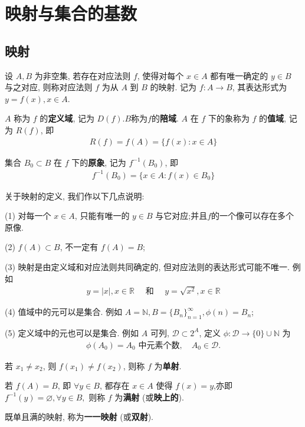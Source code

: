 \documentclass[../../main.tex]{subfiles}
\begin{document}
\section{映射与集合的基数}

\subsection{映射}

\begin{definition}[映射]
设 $A, B$ 为非空集, 若存在对应法则 $f$, 使得对每个 $x \in A$ 都有唯一确定的 $y \in B$ 与之对应, 则称对应法则 $f$ 为从 $A$ 到 $B$ 的映射. 记为 $f : A \to B$, 其表达形式为 $y = f(x), x \in A$.

$A$ 称为 $f$ 的\textbf{定义域}, 记为 $D(f)$.$B$称为$f$的\textbf{陪域}.
$A$ 在 $f$ 下的象称为 $f$ 的\textbf{值域}, 记为 $R(f)$, 即
\begin{align*}
R(f) = f(A) = \{f(x) : x \in A\}
\end{align*}

集合 $B_0 \subset B$ 在 $f$ 下的\textbf{原象}, 记为 $f^{-1}(B_0)$, 即
\begin{align*}
f^{-1}(B_0) = \{x \in A : f(x) \in B_0\}
\end{align*}
\end{definition}
\begin{remark}
关于映射的定义, 我们作以下几点说明:

(1) 对每一个 $x \in A$, 只能有唯一的 $y \in B$ 与它对应;并且$f$的一个像可以存在多个原像.

(2) $f(A) \subset B$, 不一定有 $f(A) = B$;

(3) 映射是由定义域和对应法则共同确定的, 但对应法则的表达形式可能不唯一. 例如
\begin{align*}
y = |x|, x \in \mathbb{R} \quad \text{ 和 } \quad y = \sqrt{x^2}, x \in \mathbb{R}
\end{align*}

(4) 值域中的元可以是集合. 例如 $A = \mathbb{N}, B = \{B_n\}_{n = 1}^{\infty}, \phi(n) = B_n$;

(5) 定义域中的元也可以是集合. 例如 $A$ 可列, $\mathcal{D} \subset 2^A$, 定义 $\phi : \mathcal{D} \to \{0\} \cup \mathbb{N}$ 为
\begin{align*}
\phi(A_0) = A_0 \text{ 中元素个数}, \quad A_0 \in \mathcal{D}.
\end{align*} 
\end{remark}

\begin{definition}[单射、满射和双射]
若 $x_1 \neq x_2$, 则 $f(x_1) \neq f(x_2)$, 则称 $f$ 为\textbf{单射}.

若 $f(A) = B$, 即 $\forall y \in B$, 都存在 $x \in A$ 使得 $f(x) = y$,亦即$f^{-1}(y)=\varnothing ,\forall y\in B,$ 则称 $f$ 为\textbf{满射} (或\textbf{映上的}).

既单且满的映射, 称为\textbf{一一映射} (或\textbf{双射}).
\end{definition}
\end{document}
